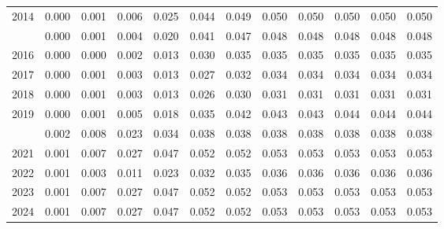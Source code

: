 \documentclass[
]{article}
\begin{document}
\begin{longtable}[t]{lrrrrrrrrrrr}
2014 & 0.000 & 0.001 & 0.006 & 0.025 & 0.044 & 0.049 & 0.050 & 0.050 & 0.050 & 0.050 & 0.050\\
\addlinespace
2015 & 0.000 & 0.001 & 0.004 & 0.020 & 0.041 & 0.047 & 0.048 & 0.048 & 0.048 & 0.048 & 0.048\\
2016 & 0.000 & 0.000 & 0.002 & 0.013 & 0.030 & 0.035 & 0.035 & 0.035 & 0.035 & 0.035 & 0.035\\
2017 & 0.000 & 0.001 & 0.003 & 0.013 & 0.027 & 0.032 & 0.034 & 0.034 & 0.034 & 0.034 & 0.034\\
2018 & 0.000 & 0.001 & 0.003 & 0.013 & 0.026 & 0.030 & 0.031 & 0.031 & 0.031 & 0.031 & 0.031\\
2019 & 0.000 & 0.001 & 0.005 & 0.018 & 0.035 & 0.042 & 0.043 & 0.043 & 0.044 & 0.044 & 0.044\\
\addlinespace
2020 & 0.002 & 0.008 & 0.023 & 0.034 & 0.038 & 0.038 & 0.038 & 0.038 & 0.038 & 0.038 & 0.038\\
2021 & 0.001 & 0.007 & 0.027 & 0.047 & 0.052 & 0.052 & 0.053 & 0.053 & 0.053 & 0.053 & 0.053\\
2022 & 0.001 & 0.003 & 0.011 & 0.023 & 0.032 & 0.035 & 0.036 & 0.036 & 0.036 & 0.036 & 0.036\\
2023 & 0.001 & 0.007 & 0.027 & 0.047 & 0.052 & 0.052 & 0.053 & 0.053 & 0.053 & 0.053 & 0.053\\
2024 & 0.001 & 0.007 & 0.027 & 0.047 & 0.052 & 0.052 & 0.053 & 0.053 & 0.053 & 0.053 & 0.053\\*
\end{longtable}
\end{document}
